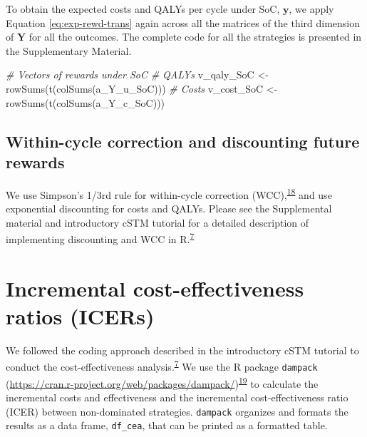 \documentclass[
]{article}
\newenvironment{Shaded}{\begin{snugshade}}{\end{snugshade}}
\newcommand{\CommentTok}[1]{\textcolor[rgb]{0.56,0.35,0.01}{\textit{#1}}}
\newcommand{\FunctionTok}[1]{\textcolor[rgb]{0.00,0.00,0.00}{#1}}
\newcommand{\NormalTok}[1]{#1}
\newcommand{\OtherTok}[1]{\textcolor[rgb]{0.56,0.35,0.01}{#1}}
\begin{document}
To obtain the expected costs and QALYs per cycle under SoC, \(\mathbf{y}\), we apply Equation \eqref{eq:exp-rewd-trans} again across all the matrices of the third dimension of \(\mathbf{Y}\) for all the outcomes. The complete code for all the strategies is presented in the Supplementary Material.

\begin{Shaded}
\begin{Highlighting}[]
\CommentTok{\# Vectors of rewards under SoC}
\CommentTok{\# QALYs}
\NormalTok{v\_qaly\_SoC }\OtherTok{\textless{}{-}} \FunctionTok{rowSums}\NormalTok{(}\FunctionTok{t}\NormalTok{(}\FunctionTok{colSums}\NormalTok{(a\_Y\_u\_SoC)))}
\CommentTok{\# Costs}
\NormalTok{v\_cost\_SoC }\OtherTok{\textless{}{-}} \FunctionTok{rowSums}\NormalTok{(}\FunctionTok{t}\NormalTok{(}\FunctionTok{colSums}\NormalTok{(a\_Y\_c\_SoC)))}
\end{Highlighting}
\end{Shaded}

\hypertarget{within-cycle-correction-and-discounting-future-rewards}{%
\subsection{Within-cycle correction and discounting future rewards}\label{within-cycle-correction-and-discounting-future-rewards}}

We use Simpson's 1/3rd rule for within-cycle correction (WCC),\textsuperscript{\protect\hyperlink{ref-Elbasha2016a}{18}} and use exponential discounting for costs and QALYs. Please see the Supplemental material and introductory cSTM tutorial for a detailed description of implementing discounting and WCC in R.\textsuperscript{\protect\hyperlink{ref-Alarid-Escudero2022b}{7}}

\hypertarget{incremental-cost-effectiveness-ratios-icers}{%
\section{Incremental cost-effectiveness ratios (ICERs)}\label{incremental-cost-effectiveness-ratios-icers}}

We followed the coding approach described in the introductory cSTM tutorial to conduct the cost-effectiveness analysis.\textsuperscript{\protect\hyperlink{ref-Alarid-Escudero2022b}{7}} We use the R package \texttt{dampack} (\url{https://cran.r-project.org/web/packages/dampack/})\textsuperscript{\protect\hyperlink{ref-Alarid-Escudero2021}{19}} to calculate the incremental costs and effectiveness and the incremental cost-effectiveness ratio (ICER) between non-dominated strategies. \texttt{dampack} organizes and formats the results as a data frame, \texttt{df\_cea}, that can be printed as a formatted table.
\end{document}
